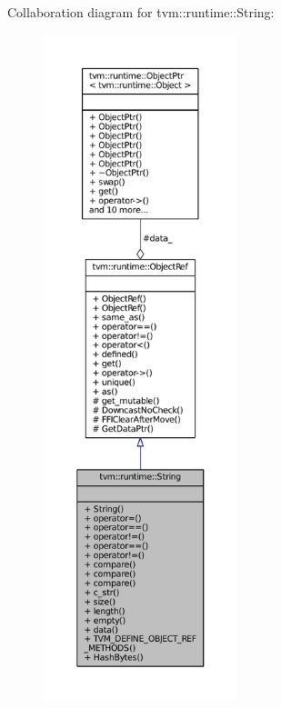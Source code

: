 Collaboration diagram for tvm\+:\+:runtime\+:\+:String\+:
\nopagebreak
\begin{figure}[H]
\begin{center}
\leavevmode
\includegraphics[height=550pt]{classtvm_1_1runtime_1_1String__coll__graph}
\end{center}
\end{figure}
